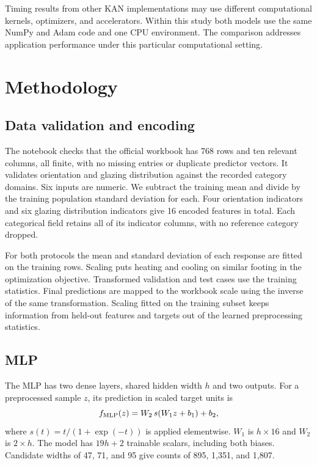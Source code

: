 \documentclass[11pt,twocolumn,letterpaper]{article}
\begin{document}
Timing results from other KAN implementations may use different computational kernels, optimizers, and accelerators. Within this study both models use the same NumPy and Adam code and one CPU environment. The comparison addresses application performance under this particular computational setting.


\section{Methodology}
\subsection{Data validation and encoding}
The notebook checks that the official workbook has 768 rows and ten relevant columns, all finite, with no missing entries or duplicate predictor vectors. It validates orientation and glazing distribution against the recorded category domains. Six inputs are numeric. We subtract the training mean and divide by the training population standard deviation for each. Four orientation indicators and six glazing distribution indicators give 16 encoded features in total. Each categorical field retains all of its indicator columns, with no reference category dropped.

For both protocols the mean and standard deviation of each response are fitted on the training rows. Scaling puts heating and cooling on similar footing in the optimization objective. Transformed validation and test cases use the training statistics. Final predictions are mapped to the workbook scale using the inverse of the same transformation. Scaling fitted on the training subset keeps information from held-out features and targets out of the learned preprocessing statistics.

\subsection{MLP}
The MLP has two dense layers, shared hidden width \(h\) and two outputs. For a preprocessed sample \(z\), its prediction in scaled target units is
\begin{equation}
f_{\rm MLP}(z)= W_2\,s(W_1 z+b_1)+b_2 ,
\end{equation}
where \(s(t)=t/(1+\exp(-t))\) is applied elementwise. \(W_1\) is \(h\times16\) and \(W_2\) is \(2\times h\). The model has \(19h+2\) trainable scalars, including both biases. Candidate widths of 47, 71, and 95 give counts of 895, 1,351, and 1,807.
\end{document}
